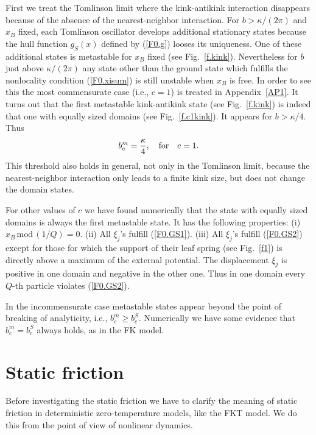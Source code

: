 First we treat the Tomlinson limit where the kink-antikink
interaction disappears because of the absence of the nearest-neighbor
interaction. For $b>\kappa/(2\pi)$ and $x_B$ fixed, each Tomlinson
oscillator develops additional stationary states because the hull
function $g_S(x)$ defined by (\ref{F0.g}) looses its uniqueness. One
of these additional states is metastable for $x_B$ fixed (see
Fig.~\ref{f.kink}). Nevertheless for $b$ just above $\kappa/(2\pi)$
any state other than the ground state which fulfills the nonlocality
condition (\ref{F0.xisum}) is still unstable when $x_B$ is free.  In
order to see this the most commensurate case (i.e., $c=1$) is treated
in Appendix~\ref{AP1}. It turns out that the first metastable
kink-antikink state (see Fig.~\ref{f.kink}) is indeed that one with
equally sized domains (see Fig.~\ref{f.c1kink}). It appears for
$b>\kappa/4$. Thus 
\begin{equation}
  b_c^m=\frac{\kappa}{4},\quad{\rm for}\quad c=1.
  \label{F0.bcm.c0}
\end{equation}
This threshold also holds in general, not only in the Tomlinson
limit, because the nearest-neighbor interaction only leads to a finite
kink size, but does not change the domain states.

For other values of $c$ we have found numerically that the state with
equally sized domains is always the first metastable state. It has
the following properties:  (i) $x_B\,\mbox{mod}\,(1/Q)=0$. (ii) All
$\xi_j$'s fulfill (\ref{F0.GS1}).  (iii) All $\xi_j$'s fulfill
(\ref{F0.GS2}) except for those for which the support of their leaf
spring (see Fig.~\ref{f1}) is directly above a maximum of the
external potential. The displacement $\xi_j$ is positive in one
domain and negative in the other one.  Thus in one domain every
$Q$-th particle violates (\ref{F0.GS2}).

In the incommensurate case metastable states appear beyond the point
of breaking of analyticity, i.e., $b_c^m\ge b_c^S$.  Numerically we
have some evidence that $b_c^m=b_c^S$ always holds, as in the FK
model\cite{aub.78}.

\section{\protect\label{STA}Static friction}

Before investigating the static friction we have to
clarify the meaning of static friction in deterministic
zero-temperature models, like the FKT model. We do this from the 
point of view of nonlinear dynamics. 

